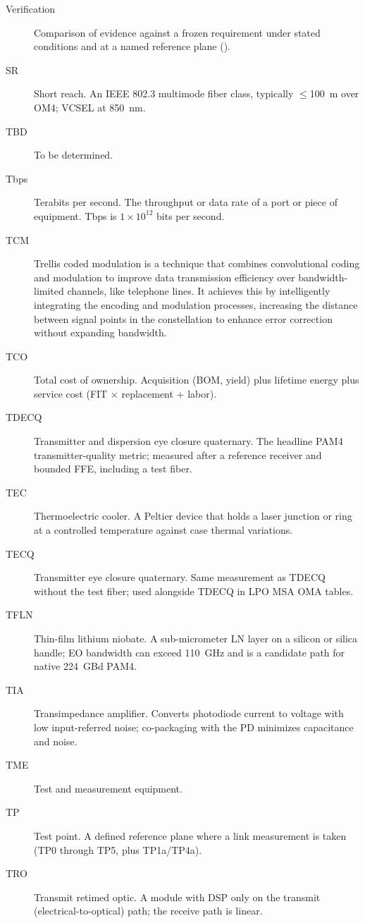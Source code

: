 \begin{description}
\item[Verification] Comparison of evidence against a frozen requirement under stated conditions and at a named reference plane ().
\item[SR] Short reach. An IEEE 802.3 multimode fiber class, typically $\le$100~m over OM4; VCSEL at 850~nm.
\item[TBD] To be determined.
\item[Tbps] Terabits per second. The throughput or data rate of a port or piece of equipment. Tbps is $1\times10^{12}$ bits per second.
\item[TCM] Trellis coded modulation is a technique that combines convolutional coding and modulation to improve data transmission efficiency over bandwidth-limited channels, like telephone lines. It achieves this by intelligently integrating the encoding and modulation processes, increasing the distance between signal points in the constellation to enhance error correction without expanding bandwidth.
\item[TCO] Total cost of ownership. Acquisition (BOM, yield) plus lifetime energy plus service cost (FIT $\times$ replacement + labor).
\item[TDECQ] Transmitter and dispersion eye closure quaternary. The headline PAM4 transmitter-quality metric; measured after a reference receiver and bounded FFE, including a test fiber.
\item[TEC] Thermoelectric cooler. A Peltier device that holds a laser junction or ring at a controlled temperature against case thermal variations.
\item[TECQ] Transmitter eye closure quaternary. Same measurement as TDECQ without the test fiber; used alongside TDECQ in LPO MSA OMA tables.
\item[TFLN] Thin-film lithium niobate. A sub-micrometer LN layer on a silicon or silica handle; EO bandwidth can exceed 110~GHz and is a candidate path for native 224~GBd PAM4.
\item[TIA] Transimpedance amplifier. Converts photodiode current to voltage with low input-referred noise; co-packaging with the PD minimizes capacitance and noise.
\item[TME] Test and measurement equipment.
\item[TP] Test point. A defined reference plane where a link measurement is taken (TP0 through TP5, plus TP1a/TP4a).
\item[TRO] Transmit retimed optic. A module with DSP only on the transmit (electrical-to-optical) path; the receive path is linear.

\end{description}

